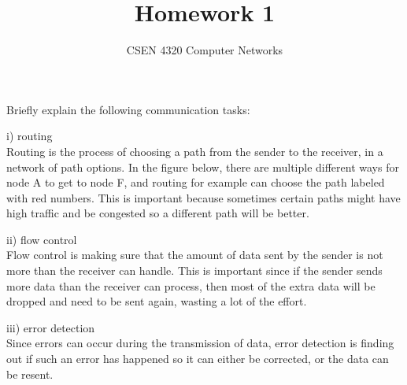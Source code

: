 \documentclass[12pt]{article}
\newenvironment{problem}[2][Problem]{\begin{trivlist}
\item[\hskip \labelsep {\bfseries #1}\hskip \labelsep {\bfseries #2.}]}{\end{trivlist}}
\begin{document}
 
 
\title{Homework 1}%
\author{CSEN 4320 Computer Networks} %
 
\maketitle
 
\begin{problem}{1} %
Briefly explain the following communication tasks:

i) routing\\
Routing is the process of choosing a path from the sender to the receiver, in a network of path options.
In the figure below, there are multiple different ways for node A to get to node F, and routing for example can choose
the path labeled with red numbers. This is important because sometimes certain paths might have high traffic and be congested so a different path will be better.\\

ii) flow control\\
Flow control is making sure that the amount of data sent by the sender is not more than the receiver can handle. 
This is important since if the sender sends more data than the receiver can process, then most of the extra data will be dropped and need to be sent again, wasting a lot of the effort.

iii) error detection\\
Since errors can occur during the transmission of data, error detection is finding out if such an error has happened so it can either be corrected, or the data can be resent.
\end{problem}
\end{document}
